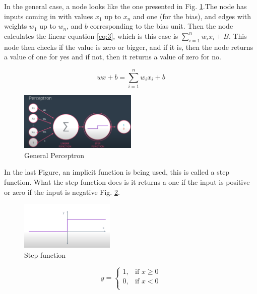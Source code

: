 \documentclass{article}
\begin{document}
In the general case, a node looks like the one presented in Fig. \ref{fig:f8}.The node has inputs coming in with values \(x_1\) up to \(x_n\) and one (for the bias), and edges with weights \(w_1\) up to \(w_n\), and \(b\) corresponding to the bias unit. Then the node calculates the linear equation \eqref{eq:3}, which is this case is \(\sum_{i=1}^n w_i x_i + B\). This node then checks if the value is zero or bigger, and if it is, then the node returns a value of one for yes and if not, then it returns a value of zero for no. 

\[wx+b = \sum_{i=1}^n w_i x_i + b\]

\begin{figure}[ht]
    \centering
    \includegraphics[width=0.5\textwidth,height=0.5\textheight,keepaspectratio]{images/general_perceptron.PNG}
    \captionsetup{justification=centering}
    \caption{General Perceptron}
    \label{fig:f8}
\end{figure}

In the last Figure, an implicit function is being used, this is called a step function. What the step function does is it returns a one if the input is positive or zero if the input is negative Fig. \ref{fig:f9}.

\begin{figure}[ht]
    \centering
    \includegraphics[width=0.4\textwidth,height=0.4\textheight,keepaspectratio]{images/step.PNG}
    \captionsetup{justification=centering}
    \caption{Step function}
    \label{fig:f9}
\end{figure}

\[
y =
  \begin{cases}
    1, & \text{if } x \geq 0 \\
    0, & \text{if } x < 0 \\
  \end{cases}
\]
\end{document}
